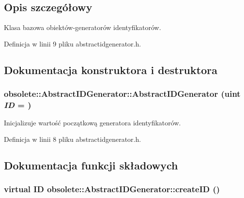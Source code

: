 \subsection{Opis szczegółowy}
Klasa bazowa obiektów-\/generatorów identyfikatorów. 

Definicja w linii 9 pliku abstractidgenerator.h.



\subsection{Dokumentacja konstruktora i destruktora}
\hypertarget{classobsolete_1_1AbstractIDGenerator_a99b8f2659b2f0120f5601789ea89edc1}{
\subsubsection[{AbstractIDGenerator}]{\setlength{\rightskip}{0pt plus 5cm}obsolete::AbstractIDGenerator::AbstractIDGenerator (uint {\em ID} = {})}}
\label{classobsolete_1_1AbstractIDGenerator_a99b8f2659b2f0120f5601789ea89edc1}


Inicjalizuje wartość początkową generatora identyfikatorów. 



Definicja w linii 8 pliku abstractidgenerator.h.



\subsection{Dokumentacja funkcji składowych}
\hypertarget{classobsolete_1_1AbstractIDGenerator_a39d2f0147e3a028fef8299770e23db90}{
\subsubsection[{createID}]{\setlength{\rightskip}{0pt plus 5cm}virtual {\bf ID} obsolete::AbstractIDGenerator::createID ()}}
\label{classobsolete_1_1AbstractIDGenerator_a39d2f0147e3a028fef8299770e23db90}


